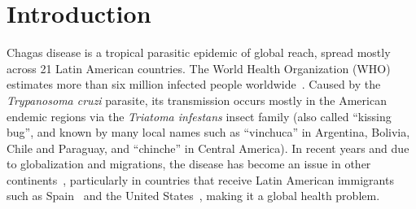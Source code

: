 
\chapter{Introduction}\label{cha:intro}


Chagas disease is a tropical parasitic epidemic of global reach, spread mostly across 21 Latin American countries. The World Health Organization (WHO) estimates more than six million infected people worldwide~\textcite{who2016}. Caused by the \textit{Trypanosoma cruzi} parasite, its transmission occurs mostly in the American endemic regions via the \textit{Triatoma infestans} insect family (also called ``kissing bug'', and known by many local names such as ``vinchuca'' in Argentina, Bolivia, Chile and Paraguay, and ``chinche'' in Central America). In recent years and due to globalization and migrations, the disease has become an %
issue in other continents~\textcite{schmunis2010chagas},
particularly in countries that receive Latin American immigrants such as Spain~\textcite{navarro2012chagas} and the United States~\textcite{hotez2013unfolding},
making it a global health problem.


